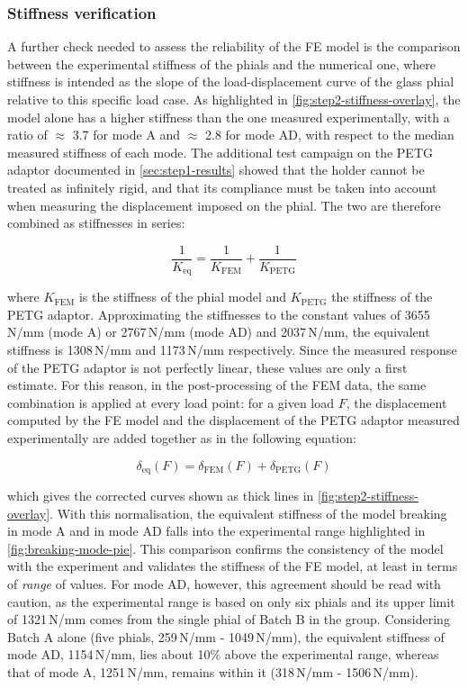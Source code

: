 \subsubsection{Stiffness verification}
A further check needed to assess the reliability of the FE model is the comparison between the experimental stiffness of the phials and the numerical one, where stiffness is intended as the slope of the load-displacement curve of the glass phial relative to this specific load case. As highlighted in \cref{fig:step2-stiffness-overlay}, the model alone has a higher stiffness than the one measured experimentally, with a ratio of $\approx$ 3.7 for mode A and $\approx$ 2.8 for mode AD, with respect to the median measured stiffness of each mode. The additional test campaign on the PETG adaptor documented in \cref{sec:step1-results} showed that the holder cannot be treated as infinitely rigid, and that its compliance must be taken into account when measuring the displacement imposed on the phial. The two are therefore combined as stiffnesses in series:

\begin{equation}\label{eq:series_stiffness}
  \frac{1}{K_\text{eq}} = \frac{1}{K_\text{FEM}} + \frac{1}{K_\text{PETG}}
\end{equation}

where $K_\text{FEM}$ is the stiffness of the phial model and $K_\text{PETG}$ the stiffness of the PETG adaptor. Approximating the stiffnesses to the constant values of 3655\,N/mm (mode A) or 2767\,N/mm (mode AD) and 2037\,N/mm, the equivalent stiffness is 1308\,N/mm and 1173\,N/mm respectively. Since the measured response of the PETG adaptor is not perfectly linear, these values are only a first estimate. For this reason, in the post-processing of the FEM data, the same combination is applied at every load point: for a given load $F$, the displacement computed by the FE model and the displacement of the PETG adaptor measured experimentally are added together as in the following equation:

\begin{equation}\label{eq:series_displacement}
  \delta_\text{eq}(F) = \delta_\text{FEM}(F) + \delta_\text{PETG}(F) 
\end{equation}

which gives the corrected curves shown as thick lines in \cref{fig:step2-stiffness-overlay}. With this normalisation, the equivalent stiffness of the model breaking in mode A and in mode AD falls into the experimental range highlighted in \cref{fig:breaking-mode-pie}. This comparison confirms the consistency of the model with the experiment and validates the stiffness of the FE model, at least in terms of \textit{range} of values. For mode AD, however, this agreement should be read with caution, as the experimental range is based on only six phials and its upper limit of 1321\,N/mm comes from the single phial of Batch B in the group. Considering Batch A alone (five phials, 259\,N/mm - 1049\,N/mm), the equivalent stiffness of mode AD, 1154\,N/mm, lies about 10\% above the experimental range, whereas that of mode A, 1251\,N/mm, remains within it (318\,N/mm - 1506\,N/mm).

